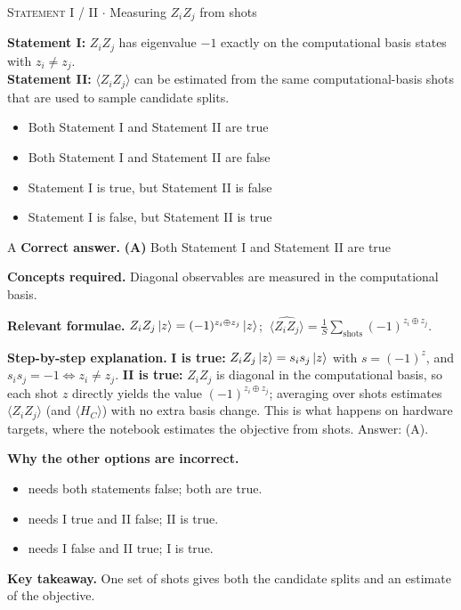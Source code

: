 \documentclass[11pt,a4paper]{article}
\newcommand{\optlabel}[1]{\textbf{(#1)}}
\newcommand{\correctlabel}[1]{\textcolor{okgreen}{\textbf{(#1)}\,\ding{51}}}
\newenvironment{qitem}[1]{\begin{list}{}{\setlength{\leftmargin}{3.3em}\setlength{\labelwidth}{3.1em}%
  \setlength{\labelsep}{0.2em}\setlength{\topsep}{3pt}\setlength{\parsep}{3pt}}\item[\textbf{Q.#1}\hfill]}{\end{list}}
\newcommand{\qsep}{\par\vspace{2pt}{\color{black!15}\hrule}\vspace{4pt}}
\newcommand{\qmeta}[2]{{\footnotesize\color{black!60}\textsc{#1} \;$\cdot$\; #2}\par}
\begin{document}
\begin{qitem}{38}
\qmeta{Statement I / II}{Measuring $Z_iZ_j$ from shots}
\textbf{Statement I:} $Z_iZ_j$ has eigenvalue $-1$ exactly on the computational basis states with $z_i \neq z_j$.\\[1mm]
\textbf{Statement II:} $\langle Z_iZ_j\rangle$ can be estimated from the same computational-basis shots that are used to sample
candidate splits.
\begin{itemize}[leftmargin=2.6em, labelsep=0.4em, itemsep=2pt, topsep=3pt]
\item[\correctlabel{A}] Both Statement I and Statement II are true
\item[\optlabel{B}] Both Statement I and Statement II are false
\item[\optlabel{C}] Statement I is true, but Statement II is false
\item[\optlabel{D}] Statement I is false, but Statement II is true
\end{itemize}
\end{qitem}
\begin{solbox}{A}
\textbf{\color{brand}Correct answer.} \textcolor{okgreen}{\textbf{(A)}} Both Statement I and Statement II are true

\textbf{\color{brand}Concepts required.} Diagonal observables are measured in the computational basis.

\textbf{\color{brand}Relevant formulae.} $Z_iZ_j\ket z = (-1)^{z_i\oplus z_j}\ket z$; $\ \widehat{\langle Z_iZ_j\rangle} = \tfrac1S\sum_{\text{shots}}(-1)^{z_i\oplus z_j}$.

\textbf{\color{brand}Step-by-step explanation.} \textbf{I is true:} $Z_iZ_j\ket z = s_is_j\ket z$ with $s = (-1)^z$, and $s_is_j = -1 \iff z_i \neq z_j$.
\textbf{II is true:} $Z_iZ_j$ is diagonal in the computational basis, so each shot $z$ directly yields the value
$(-1)^{z_i\oplus z_j}$; averaging over shots estimates $\langle Z_iZ_j\rangle$ (and $\langle H_C\rangle$) with no extra basis change.
This is what happens on hardware targets, where the notebook estimates the objective from shots. Answer: (A).

\textbf{\color{brand}Why the other options are incorrect.}
\begin{itemize}[leftmargin=2.4em, itemsep=1pt, topsep=2pt]
\item[\textbf{(B)}] needs both statements false; both are true.
\item[\textbf{(C)}] needs I true and II false; II is true.
\item[\textbf{(D)}] needs I false and II true; I is true.
\end{itemize}
\textbf{\color{brand}Key takeaway.} One set of shots gives both the candidate splits and an estimate of the objective.
\end{solbox}
\qsep
\end{document}

